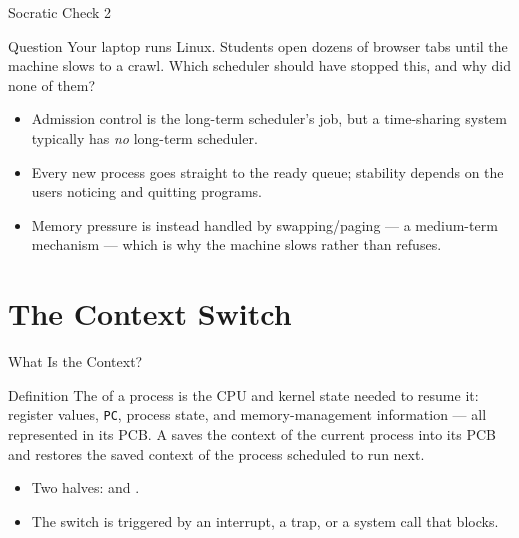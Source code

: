 \documentclass[aspectratio=169]{beamer}
\begin{document}
\begin{frame}{Socratic Check 2}
  \begin{block}{Question}
    Your laptop runs Linux. Students open dozens of browser tabs until the
    machine slows to a crawl. Which scheduler should have stopped this, and
    why did none of them?
  \end{block}
  \vspace{0.25cm}
  \begin{itemize}
    \item Admission control is the long-term scheduler's job, but a
      time-sharing system typically has \emph{no} long-term scheduler.
    \item Every new process goes straight to the ready queue; stability
      depends on the users noticing and quitting programs.
    \item Memory pressure is instead handled by swapping/paging --- a
      medium-term mechanism --- which is why the machine slows rather than
      refuses.
  \end{itemize}
\end{frame}


\section{The Context Switch}

\begin{frame}{What Is the Context?}
  \begin{block}{Definition}
    The  of a process is the CPU and kernel state needed to
    resume it: register values, \texttt{PC}, process state, and
    memory-management information --- all represented in its PCB.
    A  saves the context of the current process into its
    PCB and restores the saved context of the process scheduled to run next.
  \end{block}
  \begin{itemize}
    \item Two halves:  and .
    \item The switch is triggered by an interrupt, a trap, or a system call
      that blocks.
  \end{itemize}
\end{frame}
\end{document}
